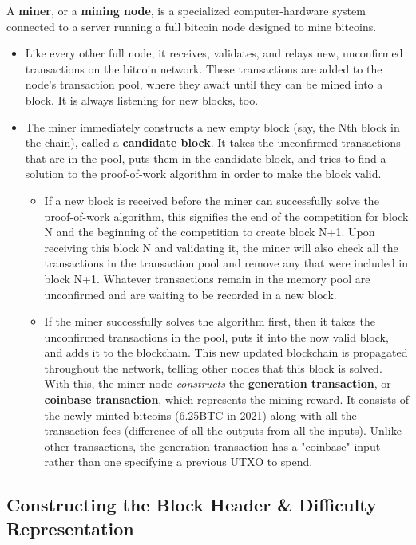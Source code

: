 \documentclass{article}
\begin{document}
    A \textbf{miner}, or a \textbf{mining node}, is a specialized computer-hardware system connected to a server running a full bitcoin node designed to mine bitcoins.

    \begin{itemize}
      \item Like every other full node, it receives, validates, and relays new, unconfirmed transactions on the bitcoin network. These transactions are added to the node's transaction pool, where they await until they can be mined into a block. It is always listening for new blocks, too.
      \item The miner immediately constructs a new empty block (say, the Nth block in the chain), called a \textbf{candidate block}. It takes the unconfirmed transactions that are in the pool, puts them in the candidate block, and tries to find a solution to the proof-of-work algorithm in order to make the block valid.
      \begin{itemize}
        \item If a new block is received before the miner can successfully solve the proof-of-work algorithm, this signifies the end of the competition for block N and the beginning of the competition to create block N+1. Upon receiving this block N and validating it, the miner will also check all the transactions in the transaction pool and remove any that were included in block N+1. Whatever transactions remain in the memory pool are unconfirmed and are waiting to be recorded in a new block.
        \item If the miner successfully solves the algorithm first, then it takes the unconfirmed transactions in the pool, puts it into the now valid block, and adds it to the blockchain. This new updated blockchain is propagated throughout the network, telling other nodes that this block is solved.
        With this, the miner node \textit{constructs} the \textbf{generation transaction}, or \textbf{coinbase transaction}, which represents the mining reward. It consists of the newly minted bitcoins (6.25BTC in 2021) along with all the transaction fees (difference of all the outputs from all the inputs). Unlike other transactions, the generation transaction has a "coinbase" input rather than one specifying a previous UTXO to spend.
      \end{itemize}
    \end{itemize}

  \subsection{Constructing the Block Header \& Difficulty Representation}
\end{document}
